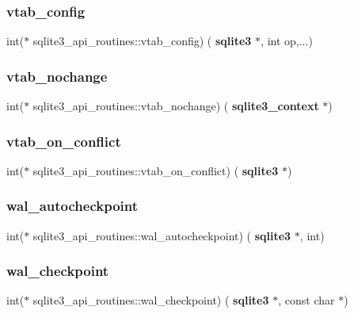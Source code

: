 \subsubsection{vtab\_config}
{\footnotesize\ttfamily int($\ast$ sqlite3\+\_\+api\+\_\+routines\+::vtab\+\_\+config) (\textbf{ sqlite3} $\ast$, int op,...)}

\mbox{\label{structsqlite3__api__routines_a8bfe65d1b203bf52c512483cb38e0b6c}} 
\subsubsection{vtab\_nochange}
{\footnotesize\ttfamily int($\ast$ sqlite3\+\_\+api\+\_\+routines\+::vtab\+\_\+nochange) (\textbf{ sqlite3\+\_\+context} $\ast$)}

\mbox{\label{structsqlite3__api__routines_a888c89ab06f21c953c7c27fdc00dd86c}} 
\subsubsection{vtab\_on\_conflict}
{\footnotesize\ttfamily int($\ast$ sqlite3\+\_\+api\+\_\+routines\+::vtab\+\_\+on\+\_\+conflict) (\textbf{ sqlite3} $\ast$)}

\mbox{\label{structsqlite3__api__routines_af3184be467b46b0100a6b3bc082ccd6a}} 
\subsubsection{wal\_autocheckpoint}
{\footnotesize\ttfamily int($\ast$ sqlite3\+\_\+api\+\_\+routines\+::wal\+\_\+autocheckpoint) (\textbf{ sqlite3} $\ast$, int)}

\mbox{\label{structsqlite3__api__routines_af247dfe2f6e83e4de878c087e7418a79}} 
\subsubsection{wal\_checkpoint}
{\footnotesize\ttfamily int($\ast$ sqlite3\+\_\+api\+\_\+routines\+::wal\+\_\+checkpoint) (\textbf{ sqlite3} $\ast$, const char $\ast$)}

